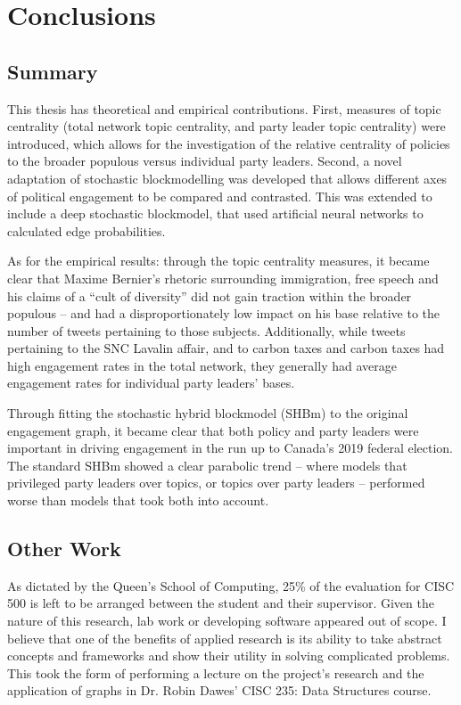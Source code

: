 \chapter{Conclusions}\label{ch:Conclusion}

\section{Summary}

This thesis has theoretical and empirical contributions. First, measures of
topic centrality (total network topic centrality, and party leader topic
centrality) were introduced, which allows for the investigation of the relative
centrality of policies to the broader populous versus individual party leaders.
Second, a novel adaptation of stochastic blockmodelling was developed that
allows different axes of political engagement to be compared and contrasted.
This was extended to include a deep stochastic blockmodel, that used artificial
neural networks to calculated edge probabilities. 

As for the empirical results: through the topic centrality measures, it became
clear that Maxime Bernier's rhetoric surrounding immigration, free speech and
his claims of a ``cult of diversity'' did not gain traction within the broader
populous -- and had a disproportionately low impact on his base relative to the
number of tweets pertaining to those subjects. Additionally, while tweets
pertaining to the SNC Lavalin affair, and to carbon taxes and carbon taxes had
high engagement rates in the total network, they generally had average
engagement rates for individual party leaders' bases. 

Through fitting the stochastic hybrid blockmodel (SHBm) to the original
engagement graph, it became clear that both policy and party leaders were
important in driving engagement in the run up to Canada's 2019 federal election.
The standard SHBm showed a clear parabolic trend -- where models that privileged
party leaders over topics, or topics over party leaders -- performed worse than
models that took both into account. 

\section{Other Work}

As dictated by the Queen’s School of Computing, 25\% of the evaluation for CISC
500 is left to be arranged between the student and their supervisor. Given the
nature of this research, lab work or developing software appeared out of scope.
I believe that one of the benefits of applied research is its ability to take
abstract concepts and frameworks and show their utility in solving complicated
problems. This took the form of performing a lecture on the project's research
and the application of graphs in Dr. Robin Dawes’ CISC 235: Data Structures
course.

